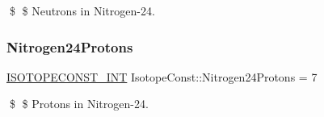 \$ \$ Neutrons in Nitrogen-\/24. \mbox{\label{group___isotope_const-_nitrogen-_n24_gad7c5b585746c6070cbbb90b216af5934}} 
\subsubsection{\texorpdfstring{Nitrogen24\+Protons}{Nitrogen24Protons}}
{\footnotesize\ttfamily \mbox{\hyperlink{group___isotope_const-_macros_ga5f18360b3e99483a35c32d789e62621c}{I\+S\+O\+T\+O\+P\+E\+C\+O\+N\+S\+T\+\_\+\+I\+NT}} Isotope\+Const\+::\+Nitrogen24\+Protons = 7}

\$ \$ Protons in Nitrogen-\/24. 